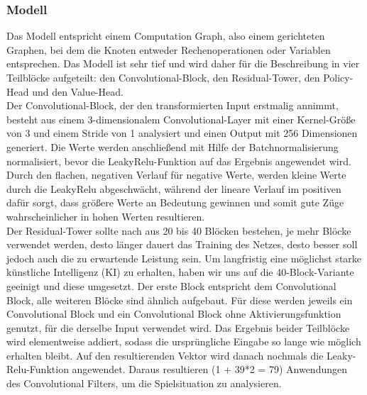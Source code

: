 \documentclass[12pt,a4paper]{article}
\begin{document}
\subsubsection{Modell}
Das Modell entspricht einem Computation Graph, also einem gerichteten Graphen, bei dem die Knoten entweder Rechenoperationen oder Variablen entsprechen. Das Modell ist sehr tief und wird daher für die Beschreibung in vier Teilblöcke aufgeteilt: den Convolutional-Block, den Residual-Tower, den Policy-Head und den Value-Head. \\
Der Convolutional-Block, der den transformierten Input erstmalig annimmt, besteht aus einem 3-dimensionalem Convolutional-Layer mit einer Kernel-Größe von 3 und einem Stride von 1 analysiert und einen Output mit 256 Dimensionen generiert. Die Werte werden anschließend mit Hilfe der Batchnormalisierung normalisiert, bevor die LeakyRelu-Funktion auf das Ergebnis angewendet wird. Durch den flachen, negativen Verlauf für negative Werte, werden kleine Werte durch die LeakyRelu abgeschwächt, während der lineare Verlauf im positiven dafür sorgt, dass größere Werte an Bedeutung gewinnen und somit gute Züge wahrscheinlicher in hohen Werten resultieren. \\
Der Residual-Tower sollte nach \cite{Silver2017} aus 20 bis 40 Blöcken bestehen, je mehr Blöcke verwendet werden, desto länger dauert das Training des Netzes, desto besser soll jedoch auch die zu erwartende Leistung sein. Um langfristig eine möglichst starke künstliche Intelligenz (KI) zu erhalten, haben wir uns auf die 40-Block-Variante geeinigt und diese umgesetzt. Der erste Block entspricht dem Convolutional Block, alle weiteren Blöcke sind ähnlich aufgebaut. Für diese werden jeweils ein Convolutional Block und ein Convolutional Block ohne Aktivierungsfunktion genutzt, für die derselbe Input verwendet wird. Das Ergebnis beider Teilblöcke wird elementweise addiert, sodass die ursprüngliche Eingabe so lange wie möglich erhalten bleibt. Auf den resultierenden Vektor wird danach nochmals die Leaky-Relu-Funktion angewendet. Daraus resultieren (1 + 39*2 = 79) Anwendungen des Convolutional Filters, um die Spielsituation zu analysieren. \\
\end{document}
